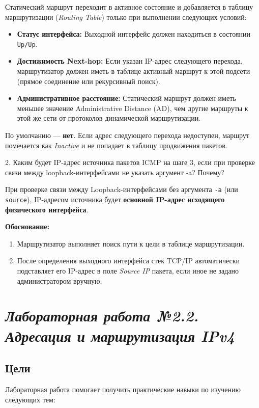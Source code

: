 Статический маршрут переходит в активное состояние и добавляется в таблицу маршрутизации (\textit{Routing Table}) только при выполнении следующих условий:
\begin{itemize}
    \item \textbf{Статус интерфейса:} Выходной интерфейс должен находиться в состоянии \texttt{Up/Up}.
    \item \textbf{Достижимость Next-hop:} Если указан IP-адрес следующего перехода, маршрутизатор должен иметь в таблице активный маршрут к этой подсети (прямое соединение или рекурсивный поиск).
    \item \textbf{Административное расстояние:} Статический маршрут должен иметь меньшее значение Administrative Distance (AD), чем другие маршруты к этой же сети от протоколов динамической маршрутизации.
\end{itemize}

По умолчанию — \textbf{нет}. Если адрес следующего перехода недоступен, маршрут помечается как \textit{Inactive} и не попадает в таблицу продвижения пакетов.

2. Каким будет IP-адрес источника пакетов ICMP на шаге 3, если при проверке связи
между loopback-интерфейсами не указать аргумент -a? Почему?

При проверке связи между Loopback-интерфейсами без аргумента \texttt{-a} (или \texttt{source}), IP-адресом источника будет \textbf{основной IP-адрес исходящего физического интерфейса}.

\textbf{Обоснование:}
\begin{enumerate}
    \item Маршрутизатор выполняет поиск пути к цели в таблице маршрутизации.
    \item После определения выходного интерфейса стек TCP/IP автоматически подставляет его IP-адрес в поле \textit{Source IP} пакета, если иное не задано администратором вручную.
\end{enumerate}

\section{\textit{Лабораторная работа №2.2. Адресация и маршрутизация IPv4}}

\subsection{Цели}

Лабораторная работа помогает получить практические навыки по изучению
следующих тем:

